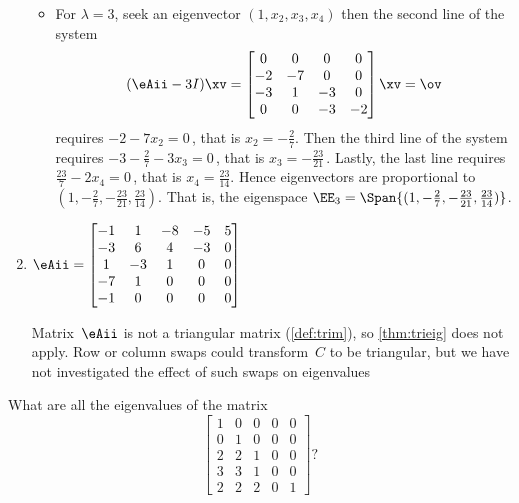 \begin{example}
\begin{enumerate}
\begin{solution}
\begin{itemize}
\item For \(\lambda=3\), seek an eigenvector \((1,x_2,x_3,x_4)\) then the second line of the system
\begin{equation*}
(\eAii-3I)\xv=
\begin{bmatrix}0&0&0&0
\\-2&-7&0&0
\\-3&1&-3&0
\\0&0&-3&-2 \end{bmatrix}\xv=\ov
\end{equation*}
requires \(-2-7x_2=0\)\,, that is \(x_2=-\frac27\).
Then the third line of the system requires \(-3-\frac27-3x_3=0\)\,, that is \(x_3=-\frac{23}{21}\)\,. 
Lastly, the last line requires \(\frac{23}7-2x_4=0\)\,, that is \(x_4=\frac{23}{14}\).
Hence eigenvectors are proportional to \((1,-\frac27,-\frac{23}{21},\frac{23}{14})\).
That is, the eigenspace \(\EE_{3}=\Span\{(1,-\frac27,-\frac{23}{21},\frac{23}{14})\}\).

\end{itemize}
\end{solution}


\item \(\eAii=\begin{bmatrix} -1&1&-8&-5&5
\\-3&6&4&-3&0
\\1&-3&1&0&0
\\-7&1&0&0&0
\\-1&0&0&0&0 \end{bmatrix}\)
\begin{solution} 
Matrix~\(\eAii\) is not a triangular matrix (\cref{def:trim}), so \cref{thm:trieig} does not apply.
Row or column swaps could transform~\(C\) to be triangular, but we have not investigated the effect of such swaps on eigenvalues 
\end{solution}
\end{enumerate}
\end{example}




\begin{activity}
What are all the eigenvalues of the matrix
\begin{equation*}
\begin{bmatrix} 1&0&0&0&0
\\0&1&0&0&0
\\2&2&1&0&0
\\3&3&1&0&0
\\2&2&2&0&1
 \end{bmatrix}?
\end{equation*}
\end{activity}






